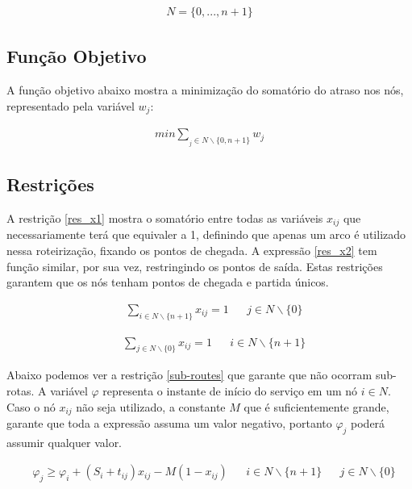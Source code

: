 \documentclass[12pt]{article}
\begin{document}
\begin{align}
  N = \{0, ..., n+1\} \label{nodes}
\end{align}

\subsection{Função Objetivo}

A função objetivo abaixo mostra a minimização do somatório do atraso nos nós, representado pela variável $w_j$:

\begin{align}
  min        \sum_{_j\in N\backslash \{0,n+1\}} w_j \label{obj_func}
\end{align}

\subsection{Restrições}

A restrição \eqref{res_x1} mostra o somatório entre todas as variáveis $x_{ij}$ que necessariamente terá que equivaler a 1, definindo que apenas um arco é utilizado nessa roteirização, fixando os pontos de chegada. A expressão \eqref{res_x2} tem função similar, por sua vez, restringindo os pontos de saída. Estas restrições garantem que os nós tenham pontos de chegada e partida únicos.


\begin{align}
   & \sum_{i\in N\backslash \{n+1\}} x_{ij} = 1 &  & j\in N\backslash \{0\} \label{res_x1}
\end{align}

\begin{align}
   & \sum_{j\in N\backslash \{0\}} x_{ij} = 1 &  & i\in N\backslash \{n+1\} \label{res_x2}
\end{align}

Abaixo podemos ver a restrição \eqref{sub-routes} que garante que não ocorram sub-rotas. A variável $\varphi$ representa o instante de início do serviço em um nó $i \in N$. Caso o nó $x_{ij}$ não seja utilizado, a constante $M$ que é suficientemente grande, garante que toda a expressão assuma um valor negativo, portanto $\varphi_j$ poderá assumir qualquer valor.

\begin{align}
   & \varphi_j \geq \varphi_i + (S_i + t_{ij})x_{ij} - M(1-x_{ij}) &  & i\in N\backslash \{n+1\} &  & j\in N\backslash \{0\} \label{sub-routes}
\end{align}
\end{document}
